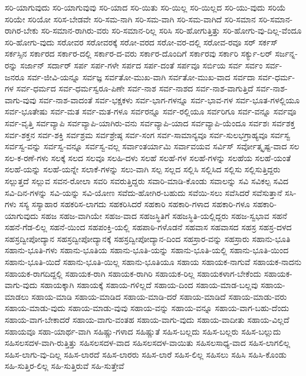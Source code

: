{ಸರಿ-ಯಾಗುವುದು
ಸರಿ-ಯಾಗುವುವು
ಸರಿ-ಯಾದ
ಸರಿ-ಯಿತು
ಸರಿ-ಯಿಲ್ಲ
ಸರಿ-ಯಿಲ್ಲದ
ಸರಿ-ಯು-ವುದು
ಸರಿಯೆ
ಸರಿಯೇ
ಸರಿಯೋ
ಸರಿಸ-ಬೇಡವೇ
ಸರಿ-ಸಮ-ನಾಗಿ
ಸರಿ-ಸಮ-ವಾಗಿ
ಸರಿ-ಸಮ-ವಾಗಿದೆ
ಸರಿ-ಸಮಾನ
ಸರಿ-ಸಮಾನ-ರಾಗಿರ-ಬೇಕು
ಸರಿ-ಸಮಾನ-ರಾಗಿರು-ವರು
ಸರಿ-ಸಮಾನ-ರಿಲ್ಲ
ಸರಿಸಿ
ಸರಿ-ಹೋಗುತ್ತಿತ್ತು
ಸರಿ-ಹೋಗು-ವು-ದಿಲ್ಲ-ವೆಂದೂ
ಸರಿ-ಹೋಗು-ವುದು
ಸರೋವರ
ಸರೋವರಕ್ಕೆ
ಸರೋ-ವರದ
ಸರೋ-ವರ-ದಲ್ಲಿ
ಸರೋವ-ರವೂ
ಸರ್
ಸರ್ಕಸ್
ಸರ್ಕಸ್ಸಿನ
ಸರ್ಕಾರದ
ಸರ್ಕಾರ-ದಲ್ಲಿ
ಸರ್ಕಾರ-ದ-ವರು
ಸರ್ಕಾರ-ದೊಂದಿಗೆ
ಸರ್ಕಾರವು
ಸರ್ಕಾರಿ
ಸರ್ಕ್ಯು-ಲರ್
ಸರ್ಜನ್ನ-ರನ್ನು
ಸರ್ಜಾನ್
ಸರ್ದಾರ್
ಸರ್ಪ
ಸರ್ಪ-ಗಳೇ
ಸರ್ಪದ
ಸರ್ಪ-ದಂತೆ
ಸರ್ಪವೂ
ಸರ್ಬಿಯ
ಸರ್ವ
ಸರ್ವಂ
ಸರ್ವ-ಜನರೂ
ಸರ್ವ-ಜೀವಿ-ಯನ್ನೂ
ಸರ್ವಜ್ಞ
ಸರ್ವತೋ-ಮುಖ-ವಾಗಿ
ಸರ್ವತೋ-ಮುಖ-ವಾದ
ಸರ್ವದಾ
ಸರ್ವ-ಧರ್ಮ-ಗಳ
ಸರ್ವ-ಧರ್ಮದ
ಸರ್ವ-ಧರ್ಮಸ್ವರೂ-ಪಿಣೇ
ಸರ್ವ-ನಾಶ
ಸರ್ವ-ನಾಶದ
ಸರ್ವ-ನಾಶ-ವಾಗುತ್ತಿದೆ
ಸರ್ವ-ನಾಶ-ವಾಗು-ವುವು
ಸರ್ವ-ನಾಶ-ವಾದಂತೆ
ಸರ್ವ-ಭಕ್ಷಕಳು
ಸರ್ವ-ಭಾಗ-ಗಳನ್ನೂ
ಸರ್ವ-ಭಾವ-ಗಳ
ಸರ್ವ-ಭೂತ-ಗಳಲ್ಲಿಯೂ
ಸರ್ವ-ಭೂತೇಷು
ಸರ್ವ-ಮತ
ಸರ್ವ-ಮತ-ಗಳೂ
ಸರ್ವರನ್ನೂ
ಸರ್ವ-ರಲ್ಲಿಯೂ
ಸರ್ವರಿಗೂ
ಸರ್ವ-ವನ್ನೂ
ಸರ್ವವೂ
ಸರ್ವ-ವೃತ್ತಿ
ಸರ್ವವ್ಯಾಪಿ
ಸರ್ವವ್ಯಾಪಿ-ಯಾಗಿರು-ವನು
ಸರ್ವವ್ಯಾಪಿ-ಯಾದ
ಸರ್ವವ್ಯಾಪಿ-ಯೆಂದೂ
ಸರ್ವಶಃ
ಸರ್ವಶಕ್ತ
ಸರ್ವ-ಶಕ್ತನ
ಸರ್ವ-ಶಕ್ತಿ
ಸರ್ವಶ್ರಮ
ಸರ್ವಶ್ರೇಷ್ಠ
ಸರ್ವ-ಸಂಗ
ಸರ್ವ-ಸಾಮಾನ್ಯವೂ
ಸರ್ವ-ಸುಲಭಗ್ರಾಹ್ಯವೂ
ಸರ್ವಸ್ವ
ಸರ್ವಸ್ವ-ವನ್ನು
ಸರ್ವಸ್ವ-ವನ್ನೂ
ಸರ್ವಸ್ವ-ವಲ್ಲ
ಸರ್ವಾಂತರ್ಯಾಮಿ
ಸರ್ವಾವಯವ
ಸರ್ವಿಸ್
ಸರ್ವೋತ್ಕೃಷ್ಟ-ವಾದ
ಸಲ
ಸಲ-ಕ-ರಣೆ-ಗಳು
ಸಲಕ್ಕೆ
ಸಲದ
ಸಲವೂ
ಸಲಹಿ-ದಳು
ಸಲಹೆ
ಸಲಹೆ-ಗಳ
ಸಲಹೆ-ಗಳನ್ನು
ಸಲಹೆಯ
ಸಲಹೆ-ಯಂತೆ
ಸಲಹೆ-ಯನ್ನು
ಸಲಹೆ-ಯನ್ನೇ
ಸಲಾಕೆ-ಗಳನ್ನು
ಸಲು-ವಾಗಿ
ಸಲ್ಪ
ಸಲ್ಲದ
ಸಲ್ಲಿಸಿ
ಸಲ್ಲಿಸಿದ
ಸಲ್ಲಿಸು
ಸಲ್ಲಿಸುತ್ತಿದ್ದರು
ಸಲ್ಲುತ್ತದೆ
ಸಲ್ಲುವ
ಸವನ-ರೋಲಾ
ಸವರಿ
ಸವರುತ್ತಿದ್ದರು
ಸವಾರಿ-ಮಾಡಿ-ಕೊಂಡು
ಸವಾಲನ್ನು
ಸವಿ
ಸವಿಕಲ್ಪ
ಸವಿದ
ಸವಿ-ದಿನ-ಗಳನ್ನು
ಸವಿ-ಯನ್ನು
ಸವಿ-ಯೋಣ
ಸವೆದು-ಹೋಗಿರ-ಬಹುದು
ಸವೆಯಿ-ಸಲು
ಸವೆಸಿದರೆ
ಸವೆಸುತ್ತಾನೆ
ಸಸಿ-ಗಳು
ಸಸ್ಯ
ಸಸ್ಯಾಹಾರ
ಸಹಕರಿಸ-ಲಾಗದು
ಸಹಕರಿಸಿದರೆ
ಸಹಕಾರಿ
ಸಹಕಾರಿ-ಗಳಾದ
ಸಹಕಾರಿ-ಗಳೂ
ಸಹಕಾರಿ-ಯಾಗುವುದು
ಸಹಜ
ಸಹಜ-ವಾಗಿಯೇ
ಸಹಜ-ವಾದ
ಸಹಜಸ್ಥಿತಿಗೆ
ಸಹಜಸ್ಥಿತಿ-ಯಲ್ಲಿದ್ದರು
ಸಹಜ-ಸ್ವಭಾವ
ಸಹನೆ
ಸಹನೆ-ಗೆಡ-ಲಿಲ್ಲ
ಸಹನೆ-ಯಿಂದ
ಸಹಪಂಕ್ತಿ-ಯಲ್ಲಿ
ಸಹಪಾಠಿ-ಗಳೊಡನೆ
ಸಹವಾಸ
ಸಹವಾಸದ
ಸಹಸ್ರ
ಸಹಸ್ರ-ದಳದ
ಸಹಸ್ರದ್ವೀಪೋದ್ಯಾನ
ಸಹಸ್ರದ್ವೀಪೋದ್ಯಾನಕ್ಕೆ
ಸಹಸ್ರದ್ವೀಪೋದ್ಯಾನ-ದಿಂದ
ಸಹಸ್ರಾರ-ವನ್ನು
ಸಹಸ್ರಾರು
ಸಹಾನು-ಭೂತಿ
ಸಹಾನು-ಭೂತಿ-ಗಳು
ಸಹಾನು-ಭೂತಿಯ
ಸಹಾನು-ಭೂತಿ-ಯನ್ನು
ಸಹಾನು-ಭೂತಿ-ಯಲ್ಲಿ
ಸಹಾನು-ಭೂತಿ-ಯಿಂದ
ಸಹಾನು-ಭೂತಿ-ಯಿದೆ
ಸಹಾನು-ಭೂತಿ-ಯಿಲ್ಲ
ಸಹಾನು-ಭೂತಿಯೂ
ಸಹಾಯ
ಸಹಾಯಕ-ನಾಗುವೆ
ಸಹಾಯಕ-ನಾದನು
ಸಹಾಯಕ-ರಾಗದಿದ್ದಲ್ಲಿ
ಸಹಾಯಕ-ರಾಗಿ
ಸಹಾಯಕ-ರಾಗಿರಿ
ಸಹಾಯಕ-ರಿಲ್ಲ
ಸಹಾಯಕಳಾಗ-ಬೇಕೆಂದು
ಸಹಾಯಕ-ವಾಗು-ವುದು
ಸಹಾಯಕ್ಕಾಗಿ
ಸಹಾಯಕ್ಕೆ
ಸಹಾಯ-ಗಳಿಲ್ಲದೆ
ಸಹಾಯ-ದಿಂದ
ಸಹಾಯ-ಮಾಡ-ಬಲ್ಲವು
ಸಹಾಯ-ಮಾಡಲು
ಸಹಾಯ-ಮಾಡಿ
ಸಹಾಯ-ಮಾಡಿದ
ಸಹಾಯ-ಮಾಡಿ-ದರೆ
ಸಹಾಯ-ಮಾಡಿದೆ
ಸಹಾಯ-ಮಾಡು-ವರು
ಸಹಾಯ-ಮಾಡು-ವುದು
ಸಹಾಯ-ಮಾಡು-ವುವು
ಸಹಾಯ-ವನ್ನು
ಸಹಾಯ-ವನ್ನೂ
ಸಹಾಯ-ವಾಗ-ಬಹು-ದೆಂದು
ಸಹಾಯ-ವಾಗ-ಬೇಕಾದರೆ
ಸಹಾಯ-ವಾಗು-ವಂತಹ
ಸಹಾಯ-ವಾಗು-ವುದು
ಸಹಾಯ-ವಾದೀತು
ಸಹಾಯ-ವಿಲ್ಲದೆ
ಸಹಾಯವೂ
ಸಹಾ-ಯಾರ್ಥ-ವಾಗಿ
ಸಹಿಷ್ಣು-ಗಳಾದ
ಸಹಿಷ್ಣುತೆ
ಸಹಿಸ-ಬಲ್ಲದು
ಸಹಿಸ-ಬಲ್ಲರು
ಸಹಿಸ-ಬಲ್ಲುದು
ಸಹಿಸಲಸದಳ-ವಾಗಿ-ರುತ್ತಿತ್ತು
ಸಹಿಸಲಸದಳ-ವಾದ
ಸಹಿಸಲಸದಳ-ವಾಯಿತು
ಸಹಿಸಲಸಾಧ್ಯ-ವಾದ
ಸಹಿಸ-ಲಾಗಲಿಲ್ಲ
ಸಹಿಸ-ಲಾಗು-ವು-ದಿಲ್ಲ
ಸಹಿಸ-ಲಾರದೆ
ಸಹಿಸ-ಲಾರರು
ಸಹಿಸ-ಲಾರೆ
ಸಹಿಸ-ಲಿಲ್ಲ
ಸಹಿಸಲು
ಸಹಿಸಿ
ಸಹಿಸಿ-ಕೊಂಡು
ಸಹಿ-ಸುತ್ತಿರ-ಲಿಲ್ಲ
ಸಹಿ-ಸುತ್ತಿರುವೆ
ಸಹಿ-ಸುತ್ತೇವೆ
}
